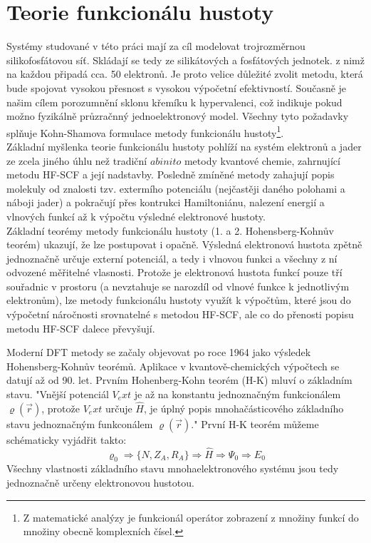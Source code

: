 \documentclass[
  digital, %
  table,   %
  lof,     %
  lot,     %
  oneside,
]{fithesis3}
\begin{document}
\section{Teorie funkcionálu hustoty}
Systémy studované v této práci mají za cíl modelovat trojrozměrnou silikofosfátovou síť. Skládají se tedy ze silikátových a fosfátových jednotek. z nimž na každou připadá cca. 50 elektronů. Je proto velice důležité zvolit metodu, která bude spojovat vysokou přesnost s vysokou výpočetní efektivností. Současně je našim cílem porozumnění sklonu křemíku k hypervalenci, což indikuje pokud možno fyzikálně průzračnný jednoelektronový model. Všechny tyto požadavky splňuje Kohn-Shamova formulace metody funkcionálu hustoty\footnote{Z matematické analýzy je funkcionál operátor zobrazení z množiny funkcí do množiny obecně komplexních čísel.}\cite{bickelhaupt2007kohn}.\\
Základní myšlenka teorie funkcionálu hustoty pohlíží na systém elektronů a jader ze zcela jiného úhlu než tradiční $ab inito$ metody kvantové chemie, zahrnující metodu HF-SCF a její nadstavby. Posledně zmíněné metody zahajují popis molekuly od znalosti tzv. extermího potenciálu (nejčastěji daného polohami  a náboji jader) a pokračují přes kontrukci Hamiltoniánu, nalezení energií a vlnových funkcí až k výpočtu výsledné elektronové hustoty.\\
Základní teorémy metody funkcionálu hustoty (1. a 2. Hohensberg-Kohnův teorém) ukazují, že lze postupovat i opačně. Výsledná elektronová hustota zpětně jednoznačně určuje externí potenciál, a tedy i vlnovou funkci a všechny z ní odvozené měřitelné vlasnosti. Protože je elektronová hustota funkcí pouze tří souřadnic v prostoru (a nevztahuje se narozdíl od vlnové funkce k jednotlivým elektronům), lze metody funkcionálu hustoty využít k výpočtům, které jsou do výpočetní náročnosti srovnatelné s metodou HF-SCF, ale co do přenosti popisu metodu HF-SCF dalece převyšují.
\cite{jensen2007introduction}

Moderní DFT metody se začaly objevovat po roce 1964 jako výsledek Hohensberg-Kohnův teorémů. Aplikace v kvantově-chemických výpočtech se datují až od 90. let. Prvním Hohenberg-Kohn teorém (H-K) mluví o základním stavu. "Vnější potenciál  $V_ext$ je až na konstantu jednoznačným funkcionálem $\varrho(\vec{r})$, protože $V_ext$ určuje $\widehat{H}$, je úplný popis mnohačásticového základního stavu jednoznačným funkconálem $\varrho(\vec{r})$."\cite{PhysRev.136.B864} První H-K teorém můžeme schématicky vyjádřit takto:
\begin{equation}
\varrho_0 \Rightarrow \{N, Z_A, R_A\} \Rightarrow \widehat{H} \Rightarrow \Psi_0 \Rightarrow E_0
 \end{equation}
 Všechny vlastnosti základního stavu mnohaelektronového systému jsou tedy jednoznačně určeny elektronovou hustotou.
\end{document}
